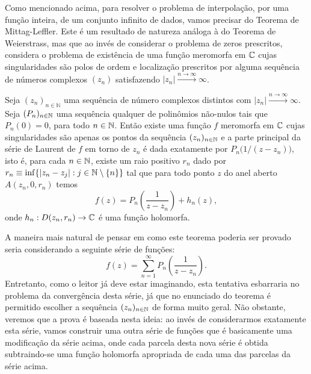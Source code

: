     Como mencionado acima, para resolver o problema 
    de interpolação, por uma função inteira, 
    de um conjunto infinito de dados, vamos
    precisar do Teorema de Mittag-Leffler. Este é um resultado
    de natureza análoga à do Teorema de Weierstrass, 
    mas que ao invés de considerar o problema de zeros prescritos,
    considera o problema de existência de uma 
    função meromorfa
    em $\mathbb{C}$ cujas singularidades são 
    polos de ordem e localização prescritos por 
    alguma sequência de números complexos 
    $(z_n)$ satisfazendo $|z_n|\xrightarrow{n\to\infty}\infty$.
    
    
    \begin{teorema}
    \label{teo-mittag-leffler}
    Seja $(z_n)_{n\in\mathbb{N}}$ uma 
    sequência de número complexos distintos com 
    $|z_n|\xrightarrow{n\to\infty}\infty$. 
    Seja $(P_n)_{n\in\mathbb{N}}$ uma sequência qualquer de polinômios 
    não-nulos tais que $P_n(0)=0$, 
    para todo $n\in\mathbb{N}$. 
    Então existe uma função $f$ meromorfa em 
    $\mathbb{C}$ cujas singularidades são apenas os pontos da sequência $(z_n)_{n\in\mathbb{N}}$ e a parte
    principal da série de Laurent de $f$ em torno de
    $z_n$ é dada exatamente por $P_n\big(1/(z-z_n)\big)$,
    isto é, para cada $n\in\mathbb{N}$, 
    existe um raio positivo $r_n$ dado por
    $r_n \equiv \inf\{|z_n-z_j|: j\in \mathbb{N}\setminus\{n\} \}$ 
    tal que para todo ponto $z$ 
    do anel aberto $A(z_n,0,r_n)$ temos
    \[
    f(z) = P_n\left(\frac{1}{z-z_n}\right)+h_n(z),
    \]
    onde $h_n:D(z_n,r_n)\to\mathbb{C}$ é uma função holomorfa.
    \end{teorema}
    
    
    A maneira mais natural de pensar em como este teorema 
    poderia ser provado  seria
    considerando a seguinte série de funções: 
    \[
     f(z) = \sum_{n=1}^{\infty} P_n\left( \frac{1}{z-z_n}  \right).
    \]
    Entretanto, como o leitor já deve estar imaginando, 
    esta tentativa esbarraria no problema
    da convergência desta série, 
    já que no enunciado do teorema é permitido escolher 
    a sequência  $(z_n)_{n\in\mathbb{N}}$ de forma muito geral. 
    Não obstante, veremos que a prova é baseada nesta ideia:
    ao invés de considerarmos exatamente esta série, 
    vamos construir uma outra série de funções que 
    é basicamente uma modificação da série acima, onde 
    cada parcela desta nova série é obtida
    subtraindo-se uma função holomorfa apropriada 
    de cada uma das parcelas da série acima. 
    
